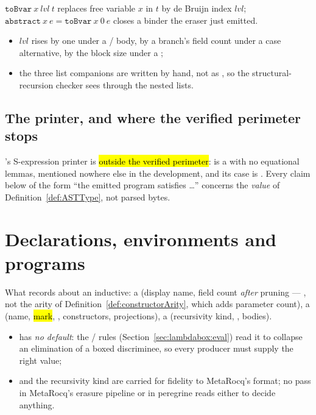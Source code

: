 \begin{definition}
\label{def:toBvar}
\leanok
{}
 $\mathtt{toBvar}\ x\ lvl\ t$ replaces free variable $x$ in $t$ by de Bruijn index $lvl$; $\mathtt{abstract}\ x\ e = \mathtt{toBvar}\ x\ 0\ e$ closes a binder the eraser just emitted.
\begin{itemize}
\item $lvl$ rises by one under a / body, by a branch's field count under a case alternative, by the block size under a ;
\item the three list companions are written by hand, not as , so the structural-recursion checker sees through the nested lists.
\end{itemize}
\end{definition}

\subsection*{The printer, and where the verified perimeter stops}

's S-expression printer is \hl{outside the verified perimeter}:  is a  with no equational lemmas, mentioned nowhere else in the development, and its  case is . Every claim below of the form ``the emitted program satisfies \ldots'' concerns the  \emph{value} of Definition~\ref{def:ASTType}, not parsed bytes.

\section{Declarations, environments and programs}
\label{sec:lambdabox:env}

\begin{definition}
\label{def:OneInductiveBody}
\leanok
{}
 What \lbox{} records about an inductive: a  (display name, field count \emph{after} pruning --- , not the arity of Definition~\ref{def:constructorArity}, which adds parameter count), a  (name, \hl{ mark}, , constructors, projections), a  (recursivity kind, , bodies).
\begin{itemize}
\item {} has \emph{no default}: the / rules (Section~\ref{sec:lambdabox:eval}) read it to collapse an elimination of a boxed discriminee, so every producer must supply the right value;
\item {} and the recursivity kind are carried for fidelity to MetaRocq's format; no pass in MetaRocq's erasure pipeline or in peregrine reads either to decide anything.
\end{itemize}
\end{definition}

